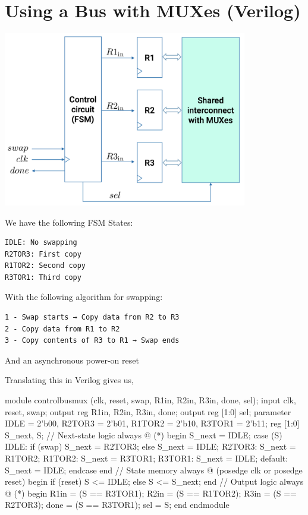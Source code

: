 \documentclass[12pt,openany]{book}
\begin{document}
\section{Using a Bus with MUXes (Verilog)}

\begin{minipage}[htp]{0.6\textwidth}
	\begin{center}
		\includegraphics[width=0.8\textwidth]{circuits/18.1.2.png}
	\end{center}
\end{minipage}
\hfill
\vline
\hfill
\begin{minipage}[htp]{0.3\textwidth}
We have the following FSM States:
\begin{verbatim}
IDLE: No swapping
R2TOR3: First copy
R1TOR2: Second copy
R3TOR1: Third copy
\end{verbatim}	
\end{minipage}
\newline
With the following algorithm for swapping:
\begin{verbatim}
1 - Swap starts → Copy data from R2 to R3
2 - Copy data from R1 to R2
3 - Copy contents of R3 to R1 → Swap ends
\end{verbatim}
And an asynchronous power-on reset


\begin{minipage}[htp]{1\textwidth}
	Translating this in Verilog gives us,
	\begin{vhdl}
module controlbusmux (clk, reset, swap, R1in, R2in, R3in, done, sel);
	input clk, reset, swap;
	output reg R1in, R2in, R3in, done;
	output reg [1:0] sel;
	parameter IDLE = 2'b00, R2TOR3 = 2'b01, R1TOR2 = 2'b10, R3TOR1 = 2'b11;
	reg [1:0] S_next, S;
	// Next-state logic
	always @ (*) begin
		S_next = IDLE;
		case (S)
		IDLE: if (swap) S_next = R2TOR3;
			  else S_next = IDLE;
		R2TOR3: S_next = R1TOR2;
		R1TOR2: S_next = R3TOR1;
		R3TOR1: S_next = IDLE;
		default: S_next = IDLE;
		endcase
	end
	// State memory
	always @ (posedge clk or posedge reset) begin
		if (reset) S <= IDLE;
		else S <= S_next;
	end
	// Output logic
	always @ (*) begin
		R1in = (S == R3TOR1);
		R2in = (S == R1TOR2);
		R3in = (S == R2TOR3);
		done = (S == R3TOR1);
		sel = S;
	end
endmodule
\end{vhdl}
\end{minipage}
\end{document}

